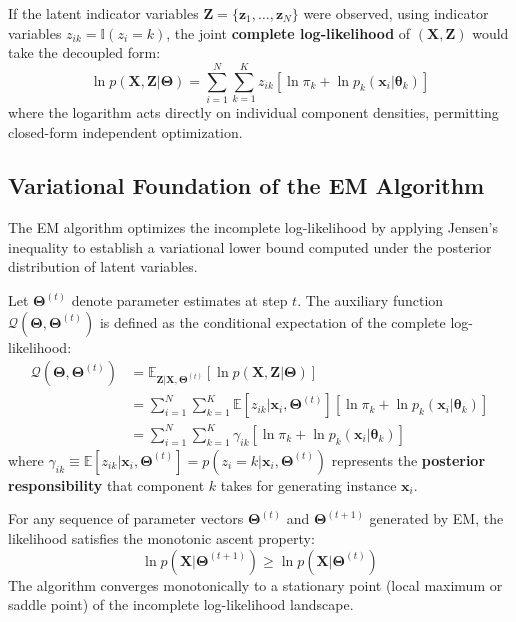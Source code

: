 If the latent indicator variables $\mathbf{Z} = \{\mathbf{z}_1, \dots, \mathbf{z}_N\}$ were observed, using indicator variables $z_{ik} = \mathbb{I}(z_i = k)$, the joint \textbf{complete log-likelihood} of $(\mathbf{X}, \mathbf{Z})$ would take the decoupled form:
\begin{equation}
\label{eq:dm-complete-loglik}
\ln p(\mathbf{X}, \mathbf{Z} | \boldsymbol{\Theta}) = \sum_{i=1}^N \sum_{k=1}^K z_{ik} \left[ \ln \pi_k + \ln p_k(\mathbf{x}_i | \boldsymbol{\theta}_k) \right]
\end{equation}
where the logarithm acts directly on individual component densities, permitting closed-form independent optimization.

\subsection{Variational Foundation of the EM Algorithm}

The EM algorithm optimizes the incomplete log-likelihood by applying Jensen's inequality to establish a variational lower bound computed under the posterior distribution of latent variables.

Let $\boldsymbol{\Theta}^{(t)}$ denote parameter estimates at step $t$. The auxiliary function $\mathcal{Q}(\boldsymbol{\Theta}, \boldsymbol{\Theta}^{(t)})$ is defined as the conditional expectation of the complete log-likelihood:
\begin{align}
\label{eq:dm-q-function}
\mathcal{Q}(\boldsymbol{\Theta}, \boldsymbol{\Theta}^{(t)}) &= \mathbb{E}_{\mathbf{Z} | \mathbf{X}, \boldsymbol{\Theta}^{(t)}} \left[ \ln p(\mathbf{X}, \mathbf{Z} | \boldsymbol{\Theta}) \right] \nonumber \\
&= \sum_{i=1}^N \sum_{k=1}^K \mathbb{E}[z_{ik} | \mathbf{x}_i, \boldsymbol{\Theta}^{(t)}] \left[ \ln \pi_k + \ln p_k(\mathbf{x}_i | \boldsymbol{\theta}_k) \right] \nonumber \\
&= \sum_{i=1}^N \sum_{k=1}^K \gamma_{ik} \left[ \ln \pi_k + \ln p_k(\mathbf{x}_i | \boldsymbol{\theta}_k) \right]
\end{align}
where $\gamma_{ik} \equiv \mathbb{E}[z_{ik} | \mathbf{x}_i, \boldsymbol{\Theta}^{(t)}] = p(z_i = k | \mathbf{x}_i, \boldsymbol{\Theta}^{(t)})$ represents the \textbf{posterior responsibility} that component $k$ takes for generating instance $\mathbf{x}_i$.

\begin{theorem}
For any sequence of parameter vectors $\boldsymbol{\Theta}^{(t)}$ and $\boldsymbol{\Theta}^{(t+1)}$ generated by EM, the likelihood satisfies the monotonic ascent property:
\begin{equation}
\ln p(\mathbf{X} | \boldsymbol{\Theta}^{(t+1)}) \ge \ln p(\mathbf{X} | \boldsymbol{\Theta}^{(t)})
\end{equation}
The algorithm converges monotonically to a stationary point (local maximum or saddle point) of the incomplete log-likelihood landscape.
\end{theorem}

